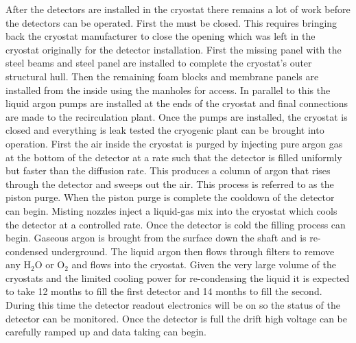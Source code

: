 After the detectors are installed in the cryostat there remains a lot
of work before the detectors can be operated. First the  must be
closed. This requires bringing back the cryostat manufacturer to close
the opening which was left in the cryostat originally for the detector
installation. First the missing panel with the steel beams and steel
panel are installed to complete the cryostat's outer structural
hull. Then the remaining foam blocks and membrane panels are installed
from the inside using the manholes for access. In parallel to this the
liquid argon pumps are installed at the ends of the cryostat and final
connections are made to the recirculation plant. Once the pumps are
installed, the cryostat is closed and everything is leak tested the
cryogenic plant can be brought into operation. First the air inside
the cryostat is purged by injecting pure argon gas at the bottom of
the detector at a rate such that the detector is filled uniformly but
faster than the diffusion rate. This produces a column of argon that
rises through the detector and sweeps out the air. This process is
referred to as the piston purge. When the piston purge is complete the
cooldown of the detector can begin. Misting nozzles inject a
liquid-gas mix into the cryostat which cools the detector at a
controlled rate. Once the detector is cold the filling process can
begin. Gaseous argon is brought from the surface down the shaft and is
re-condensed underground. The liquid argon then flows through filters
to remove any H$_2$O or O$_2$ and flows into the cryostat. Given the
very large volume of the cryostats and the limited cooling power for
re-condensing the liquid it is expected to take 12 months to fill the
first detector and 14 months to fill the second. During this time the
detector readout electronics will be on so the status of the detector
can be monitored. Once the detector is full the drift high voltage can
be carefully ramped up and data taking can begin.


